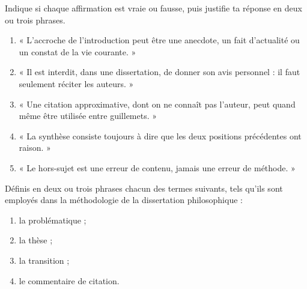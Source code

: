 \documentclass[11pt]{article}
\newcommand{\cle}[1]{{\popxbold\color{popdark}#1}}
\begin{document}
\begin{exercice}
Indique si chaque affirmation est vraie ou fausse, puis justifie ta réponse en deux ou trois phrases.
\begin{enumerate}
\item « L'accroche de l'introduction peut être une anecdote, un fait d'actualité ou un constat de la vie courante. »
\item « Il est interdit, dans une dissertation, de donner son avis personnel : il faut seulement réciter les auteurs. »
\item « Une citation approximative, dont on ne connaît pas l'auteur, peut quand même être utilisée entre guillemets. »
\item « La synthèse consiste toujours à dire que les deux positions précédentes ont raison. »
\item « Le hors-sujet est une erreur de contenu, jamais une erreur de méthode. »
\end{enumerate}
\end{exercice}

\begin{exercice}
Définis en deux ou trois phrases chacun des termes suivants, tels qu'ils sont employés dans la méthodologie de la dissertation philosophique :
\begin{enumerate}
\item la \cle{problématique} ;
\item la \cle{thèse} ;
\item la \cle{transition} ;
\item le \cle{commentaire de citation}.
\end{enumerate}
\end{exercice}
\end{document}
